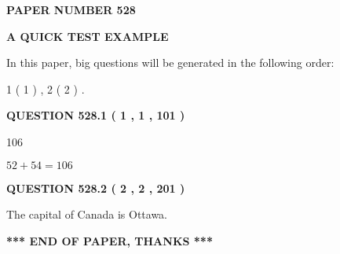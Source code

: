 \documentclass[12pt]{article}
\begin{document}
   
   
   
 {\textbf{ \Large{ PAPER NUMBER  528  }}}
   
   
\vspace{0.2in}
   
   
   
   
   
   
 \vspace{0.2in}
{\LARGE {\textbf{ A QUICK TEST EXAMPLE}}}
   
   
   
\vspace{0.2in}
   
In this paper, big questions will be generated in the following order: 
   
   
   1 ( 1 )
 ,
   2 ( 2 )
 .
  
\vspace{0.2in}
  
{\textbf{\Large{QUESTION
528.1 
 ( 1 , 1 , 101 )
}}}
  
  
 
 
\noindent{}

106
 
 
 
 
\noindent{}

$ %
52 +  %
54=   %
106$
 
 
  
\vspace{0.2in}
  
{\textbf{\Large{QUESTION
528.2 
 ( 2 , 2 , 201 )
}}}
  
  
 
 
\noindent{}
 
 
The capital of Canada is Ottawa.
 
 
 
 
   
   
 \vspace{0.2in}
 
   
   
   
   
\vspace{1.0in} 
{\textbf{\large{ *** END OF PAPER, THANKS *** }}} 
   
\end{document}
